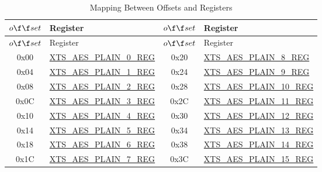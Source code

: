 \begin{longtable}[c]
{ |c|p{4.5cm} |c|p{4.5cm}|}
\caption{Mapping Between Offsets and Registers} 
\label{tab:extmemencr-data-padding}\\
\hline 
\rowcolor{lightgray}
$o{\f}{\f}set$ &  Register  & $o{\f}{\f}set$ &  Register \\\hline
\endfirsthead
\hline
\rowcolor{lightgray}
$o{\f}{\f}set$ &  Register  & $o{\f}{\f}set$ &  Register   \\\hline
\endhead
\endfoot
0x00 & \hyperref[regdesc:XTSAESPLAINNREG]{XTS\_AES\_PLAIN\_0\_REG} & 0x20 & \hyperref[regdesc:XTSAESPLAINNREG]{XTS\_AES\_PLAIN\_8\_REG} \\\hline 
0x04 & \hyperref[regdesc:XTSAESPLAINNREG]{XTS\_AES\_PLAIN\_1\_REG} & 0x24 & \hyperref[regdesc:XTSAESPLAINNREG]{XTS\_AES\_PLAIN\_9\_REG} \\\hline 
0x08 & \hyperref[regdesc:XTSAESPLAINNREG]{XTS\_AES\_PLAIN\_2\_REG} & 0x28 & \hyperref[regdesc:XTSAESPLAINNREG]{XTS\_AES\_PLAIN\_10\_REG} \\\hline 
0x0C & \hyperref[regdesc:XTSAESPLAINNREG]{XTS\_AES\_PLAIN\_3\_REG} & 0x2C & \hyperref[regdesc:XTSAESPLAINNREG]{XTS\_AES\_PLAIN\_11\_REG} \\\hline 
0x10 & \hyperref[regdesc:XTSAESPLAINNREG]{XTS\_AES\_PLAIN\_4\_REG} & 0x30 & \hyperref[regdesc:XTSAESPLAINNREG]{XTS\_AES\_PLAIN\_12\_REG} \\\hline 
0x14 & \hyperref[regdesc:XTSAESPLAINNREG]{XTS\_AES\_PLAIN\_5\_REG} & 0x34 & \hyperref[regdesc:XTSAESPLAINNREG]{XTS\_AES\_PLAIN\_13\_REG} \\\hline 
0x18 & \hyperref[regdesc:XTSAESPLAINNREG]{XTS\_AES\_PLAIN\_6\_REG} & 0x38 & \hyperref[regdesc:XTSAESPLAINNREG]{XTS\_AES\_PLAIN\_14\_REG} \\\hline 
0x1C & \hyperref[regdesc:XTSAESPLAINNREG]{XTS\_AES\_PLAIN\_7\_REG} & 0x3C & \hyperref[regdesc:XTSAESPLAINNREG]{XTS\_AES\_PLAIN\_15\_REG} \\\hline 
\end{longtable}

